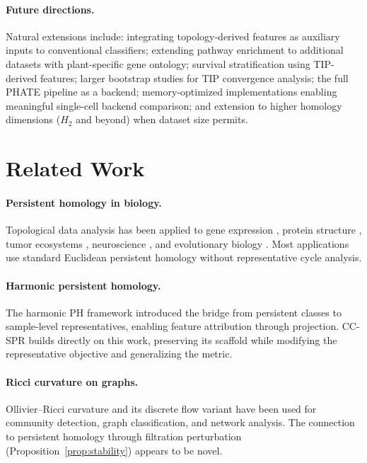 \documentclass[11pt]{article}
\begin{document}
\paragraph{Future directions.}
Natural extensions include: integrating topology-derived features as auxiliary inputs to conventional classifiers; extending pathway enrichment to additional datasets with plant-specific gene ontology; survival stratification using TIP-derived features; larger bootstrap studies for TIP convergence analysis; the full PHATE pipeline as a backend; memory-optimized implementations enabling meaningful single-cell backend comparison; and extension to higher homology dimensions ($H_2$ and beyond) when dataset size permits.

\section{Related Work}
\label{sec:related}

\paragraph{Persistent homology in biology.}
Topological data analysis has been applied to gene expression \cite{rizvi2017}, protein structure \cite{xia2014}, tumor ecosystems \cite{vipond2021}, neuroscience \cite{giusti2015}, and evolutionary biology \cite{chan2013topology}.
Most applications use standard Euclidean persistent homology without representative cycle analysis.

\paragraph{Harmonic persistent homology.}
The harmonic PH framework \cite{harmonicPH} introduced the bridge from persistent classes to sample-level representatives, enabling feature attribution through projection.
CC-SPR builds directly on this work, preserving its scaffold while modifying the representative objective and generalizing the metric.

\paragraph{Ricci curvature on graphs.}
Ollivier--Ricci curvature \cite{ollivier2007, ollivier2009} and its discrete flow variant \cite{ni2019community} have been used for community detection, graph classification, and network analysis.
The connection to persistent homology through filtration perturbation (Proposition~\ref{prop:stability}) appears to be novel.
\end{document}
